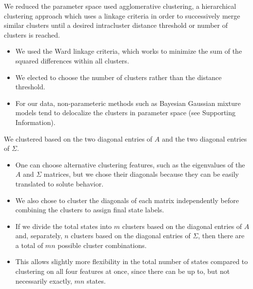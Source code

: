\documentclass{article}
\begin{document}
  We reduced the parameter space used agglomerative clustering, a hierarchical
  clustering approach which uses a linkage criteria in order to successively merge
  similar clusters until a desired intracluster distance threshold or number of
  clusters is reached. 
  \begin{itemize}
   	\item We used the Ward linkage criteria, which works to minimize the sum of
   	the squared differences within all clusters.
   	\item We elected to choose the number of clusters rather than the distance
   	threshold.
   	\item For our data, non-parameteric methods such as Bayesian Gaussian mixture
   	models tend to delocalize the clusters in parameter space (see Supporting
   	Information).
  \end{itemize}  
  
  We clustered based on the two diagonal entries of $A$ and the two diagonal entries 
  of $\Sigma$.
  \begin{itemize}
   \item One can choose alternative clustering features, such as the eigenvalues of
   the $A$ and $\Sigma$ matrices, but we chose their diagonals because they can be
   easily translated to solute behavior.
   \item We also chose to cluster the diagonals of each matrix independently before
   combining the clusters to assign final state labels. 
   \item If we divide the total states into $m$ clusters based on the diagonal entries
   of $A$ and, separately, $n$ clusters based on the diagonal entries of $\Sigma$,
   then there are a total of $mn$ possible cluster combinations.
   \item This allows slightly more flexibility in the total number of states compared
   to clustering on all four features at once, since there can be up to, but not 
   necessarily exactly, $mn$ states. 
  \end{itemize} 
  
\end{document}
